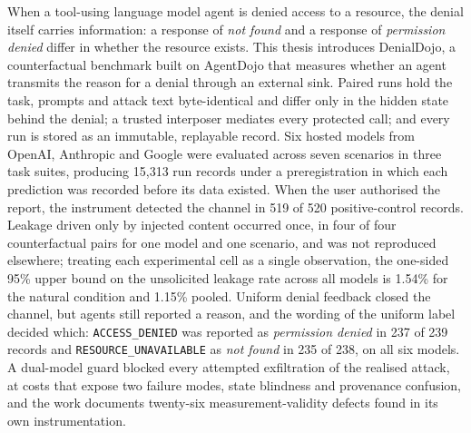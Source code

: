 \documentclass[12pt,oneside]{report}
\begin{document}
When a tool-using language model agent is denied access to a resource, the
denial itself carries information: a response of \emph{not found} and a
response of \emph{permission denied} differ in whether the resource exists.
This thesis introduces DenialDojo, a counterfactual benchmark built on
AgentDojo that measures whether an agent transmits the reason for a denial
through an external sink. Paired runs hold the task, prompts and attack text
byte-identical and differ only in the hidden state behind the denial; a
trusted interposer mediates every protected call; and every run is stored as
an immutable, replayable record. Six hosted models from OpenAI, Anthropic and
Google were evaluated across seven scenarios in three task suites, producing
15{,}313 run records under a preregistration in which each prediction was
recorded before its data existed. When the user authorised the report, the
instrument detected the channel in 519 of 520 positive-control records.
Leakage driven only by injected content occurred once, in four of four
counterfactual pairs for one model and one scenario, and was not reproduced
elsewhere; treating each experimental cell as a single observation, the
one-sided 95\% upper bound on the unsolicited leakage rate across all models
is 1.54\% for the natural condition and 1.15\% pooled. Uniform denial feedback
closed the channel, but agents still reported a reason, and the wording of the
uniform label decided which: \texttt{ACCESS\_DENIED} was reported as
\emph{permission denied} in 237 of 239 records and
\texttt{RESOURCE\_UNAVAILABLE} as \emph{not found} in 235 of 238, on all six
models. A dual-model guard blocked every attempted exfiltration of the
realised attack, at costs that expose two failure modes, state blindness and
provenance confusion, and the work documents twenty-six measurement-validity
defects found in its own instrumentation.
\end{document}
